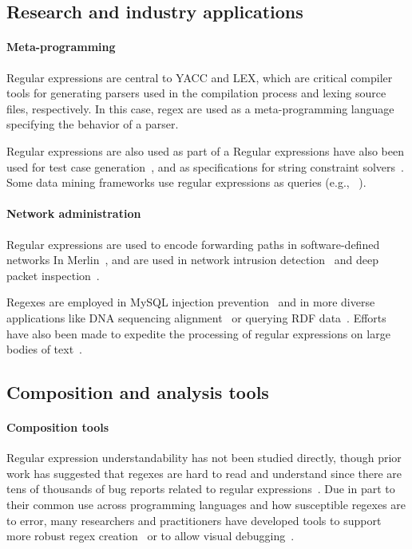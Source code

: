 \subsection{Research and industry applications}
\paragraph{Meta-programming}  Regular expressions are central to YACC and LEX, which are critical compiler tools for generating parsers used in the compilation process and lexing source files, respectively.  In this case, regex are used as a meta-programming language specifying the behavior of a parser.


Regular expressions are also used as part of a Regular expressions have also been used for test case generation~\cite{Ghosh:2013:JAT:2486788.2486925, Galler:2014:STD:2683035.2683100, Anand:2013:OSM:2503903.2503991, Tillmann:2014:TAT:2642937.2642941},  and as specifications for string constraint solvers~\cite{Trinh:2014:SSS:2660267.2660372, hampi}.  Some data mining frameworks use regular expressions as queries (e.g., ~\cite{Begel:2010:CDE:1806799.1806821}).

\paragraph{Network administration} Regular expressions are used to encode forwarding paths in software-defined networks In Merlin~\cite{Soule:2014:MLP:2674005.2674989}, and are used in network intrusion detection~\cite{network,Sommer:2003:EBN:948109.948145} and deep packet inspection~\cite{Kumar:2006:AAM:1151659.1159952,Yu:2006:FMR:1185347.1185360}.


Regexes are employed in MySQL injection prevention~\cite{Yeole:2011:ADT:1980022.1980229} and in more diverse applications like DNA sequencing alignment~\cite{1594922} or querying RDF data~\cite{Lee:2010:PSQ:1871871.1871877, Alkhateeb:2009:ESR:1540656.1540975}.  Efforts have also been made to expedite the processing of regular expressions on large bodies of text~\cite{Baeza-Yates:1996:FTS:235809.235810}.

\subsection{Composition and analysis tools}

\paragraph{Composition tools} Regular expression understandability has not been studied directly, though prior work has suggested that regexes are hard to read and understand since there are tens of thousands of bug reports related to regular expressions~\cite{Spishak:2012:TSR:2318202.2318207}.  Due in part to their common use across programming languages and how susceptible regexes are to error, many researchers and practitioners have developed tools to support more robust regex creation~\cite{Spishak:2012:TSR:2318202.2318207} or to allow visual debugging~\cite{Beck:2014:RVD:2591062.2591111}.

